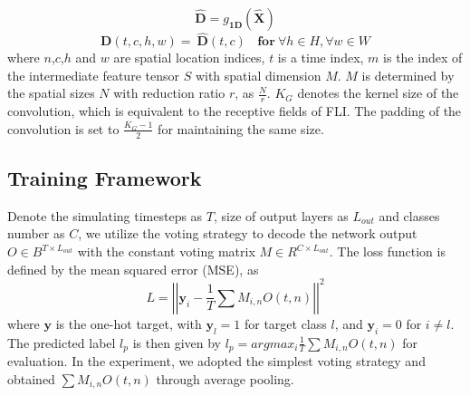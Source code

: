 \documentclass[letterpaper]{article} \usepackage[submission]{aaai23}  \usepackage{times}  \usepackage{helvet}  \usepackage{courier}  \usepackage[hyphens]{url}  \usepackage{graphicx} \urlstyle{rm} \def\UrlFont{\rm}  \usepackage{natbib}  \usepackage{caption} \frenchspacing  \setlength{\pdfpagewidth}{8.5in} \setlength{\pdfpageheight}{11in} \usepackage{algorithm}
\begin{document}
\begin{equation}
\hat{\mathbf{D}} = g_{\mathbf{1D}}\left( \hat{\mathbf{X}} \right)
\end{equation}
\begin{equation}
\mathbf{D}\left( {t,c,h,w} \right) = \mathbf{~}\hat{\mathbf{D}}\left( {t,c} \right)\mathbf{~}\mathbf{~}\mathbf{~}\mathbf{~}\mathbf{f}\mathbf{o}\mathbf{r}\mathbf{~}\forall h \in H,\forall w \in W
\end{equation}
where $n$,$c$,$h$ and $w$ are spatial location indices, $t$ is a time index, $m$ is the index of the intermediate feature tensor $S$ with spatial dimension $M$. $M$ is determined by the spatial sizes $N$ with reduction ratio $r$, as $\frac{N}{r}$. $K_G$ denotes the kernel size of the convolution, which is equivalent to the receptive fields of FLI. The padding of the convolution is set to $\frac{K_G-1}{2}$ for maintaining the same size.

\subsection{Training Framework}
Denote the simulating timesteps as $T$, size of output layers as $L_{out}$ and classes number as $C$, we utilize the voting strategy \cite{wu_direct_2019} to decode the network output $O\in B^{T\times L_{out}}$ with the constant voting matrix $M\in R^{C\times L_{out}}$. The loss function is defined by the mean squared error (MSE), as
\begin{equation}
    L = \left| \left| {\mathbf{y}_{i} - \frac{1}{T}\sum M_{i,n}O\left( {t,n} \right)} \right| \right|^{2}
\label{eq:loss}
\end{equation}
where $\mathbf{y}$ is the one-hot target, with $\mathbf{y}_l=1$ for target class $l$, and $\mathbf{y}_i=0$ for $i\neq l$. The predicted label $l_p$ is then given by $l_p=argmax_i  \frac{1}{T}\sum M_{i,n}O\left( {t,n} \right)$ for evaluation. In the experiment, we adopted the simplest voting strategy and obtained $\sum M_{i,n}O\left( {t,n} \right)$ through average pooling.
\end{document}
